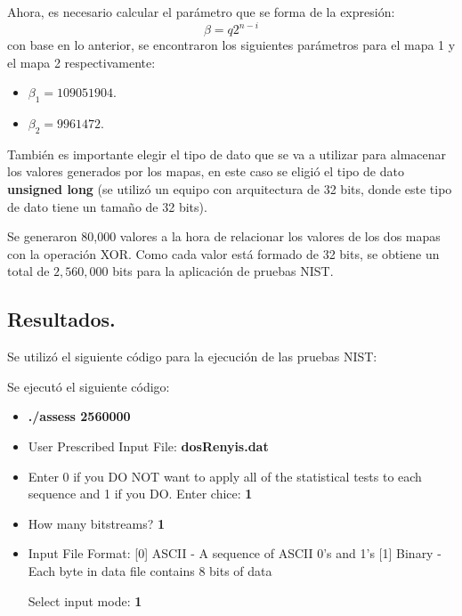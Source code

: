 \documentclass[12pt,3p]{elsarticle}
\begin{document}
Ahora, es necesario calcular el parámetro que se forma de la expresión:  
\begin{equation}
\beta = q 2^{n-i}
\end{equation}
con base en lo anterior, se encontraron los siguientes parámetros para el mapa 1 y el mapa 2 respectivamente:

\begin{itemize}
\item $\beta_{1}=109051904$.
\item $\beta_{2}=9961472$.
\end{itemize}



 
También es importante elegir el tipo de dato que se va a utilizar para almacenar los valores generados por los mapas, en este caso se eligió el tipo de dato \textbf{unsigned long} (se utilizó un equipo con arquitectura de 32 bits, donde este tipo de dato tiene un tamaño de 32 bits).

Se generaron 80,000 valores  a la hora de relacionar los valores de los dos mapas con la operación XOR. Como cada valor está formado de 32 bits, se  obtiene un total de $2,560,000$ bits para la aplicación de pruebas NIST.



\subsection{Resultados.}

Se utilizó el siguiente código para la ejecución de las pruebas NIST:

Se ejecutó el siguiente código:

\begin{itemize}
\item \textbf{./assess 2560000}
\item User Prescribed Input File: \textbf{dosRenyis.dat}
\item    Enter 0 if you DO NOT want to apply all of the
         statistical tests to each sequence and 1 if you DO. Enter chice: \textbf{1}
                  
\item  How many bitstreams? \textbf{1}

\item Input File Format:
    [0] ASCII - A sequence of ASCII 0's and 1's
    [1] Binary - Each byte in data file contains 8 bits of data

   Select input mode:  \textbf{1}
\end{itemize}
\end{document}
